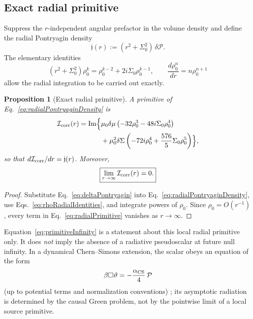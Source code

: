 \documentclass[aps,prd,reprint,nofootinbib,superscriptaddress]{revtex4-2}
\newtheorem{proposition}[theorem]{Proposition}
\theoremstyle{definition}
\theoremstyle{remark}
\begin{document}
\subsection{Exact radial primitive}

Suppress the $r$-independent angular prefactor in the volume density and define the radial Pontryagin density
\begin{equation}
 \mathfrak j(r):=(r^2+\Sigma_0^2)\,\delta\mathcal P.
 \label{eq:radialPontryaginDensity}
\end{equation}
The elementary identities
\begin{equation}
 (r^2+\Sigma_0^2)\rho_0^k
 =\rho_0^{k-2}+2i\Sigma_0\rho_0^{k-1},
 \qquad
 \frac{d\rho_0^n}{dr}=n\rho_0^{n+1}
 \label{eq:rhoRadialIdentities}
\end{equation}
allow the radial integration to be carried out exactly.
\begin{proposition}[Exact radial primitive]
\label{prop:radialPrimitive}
A primitive of Eq.~\eqref{eq:radialPontryaginDensity} is
\begin{align}
 \mathcal I_{\rm corr}(r)=\operatorname{Im}\Bigl\{&
 \mu_0\delta\mu
 \left(-32\rho_0^3-48i\Sigma_0\rho_0^4\right)
 \nonumber\\
 &+\mu_0^2\delta\Sigma
 \left(-72i\rho_0^4+\frac{576}{5}\Sigma_0\rho_0^5\right)
 \Bigr\},
 \label{eq:radialPrimitive}
\end{align}
so that $d\mathcal I_{\rm corr}/dr=\mathfrak j(r)$. Moreover,
\begin{equation}
 \boxed{\lim_{r\to\infty}\mathcal I_{\rm corr}(r)=0.}
 \label{eq:primitiveInfinity}
\end{equation}
\end{proposition}
\begin{proof}
Substitute Eq.~\eqref{eq:deltaPontryagin} into Eq.~\eqref{eq:radialPontryaginDensity}, use Eqs.~\eqref{eq:rhoRadialIdentities}, and integrate powers of $\rho_0$. Since $\rho_0=O(r^{-1})$, every term in Eq.~\eqref{eq:radialPrimitive} vanishes as $r\to\infty$.
\end{proof}

Equation~\eqref{eq:primitiveInfinity} is a statement about this local radial primitive only. It does \emph{not} imply the absence of a radiative pseudoscalar at future null infinity. In a dynamical Chern--Simons extension, the scalar obeys an equation of the form
\begin{equation}
 \beta\Box\vartheta
 =-\frac{\alpha_{\rm CS}}{4}\,\mathcal P
 \label{eq:dCSequation}
\end{equation}
(up to potential terms and normalization conventions) \cite{AlexanderYunes2009,YunesPretorius2009}; its asymptotic radiation is determined by the causal Green problem, not by the pointwise limit of a local source primitive.
\end{document}
